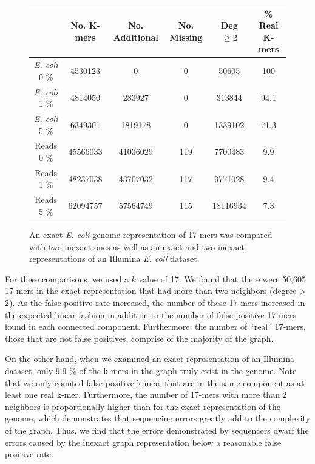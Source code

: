 \documentclass[12pt]{article} \usepackage{simplemargins}
\begin{document}
\begin{figure}
\begin{tabular}{ | c || c | c | c | c | c | }
\hline
 & No. K-mers & No. Additional & No. Missing & Deg $\ge 2$ & \% Real K-mers \\ \hline \hline
\emph{E. coli} 0 \% & 4530123 & 0 & 0 & 50605 & 100 \\ \hline
\emph{E. coli} 1 \% & 4814050 & 283927 & 0 & 313844 & 94.1 \\ \hline
\emph{E. coli} 5 \% & 6349301 & 1819178 & 0 & 1339102 & 71.3 \\ \hline
Reads 0 \% & 45566033 & 41036029 & 119 & 7700483 & 9.9 \\ \hline
Reads 1 \% & 48237038 & 43707032 & 117 & 9771028 & 9.4 \\ \hline
Reads 5 \% & 62094757 & 57564749 & 115 & 18116934 & 7.3 \\
\hline
\end{tabular}
\caption{An exact \emph{E. coli} genome representation of 17-mers was compared with 
two inexact ones as well as an exact and two inexact representations of an Illumina 
\emph{E. coli} dataset.}
\end{figure}

For these comparisons, we used a $k$ value of 17. We found 
that there were 50,605 17-mers in the exact representation that had more 
than two neighbors (degree > 2). As the false positive rate 
increased, the number of these 
17-mers increased in the expected linear fashion in addition to the number of 
false positive 17-mers found in each connected component. Furthermore, the number of 
``real'' 17-mers, those that are not false positives, 
comprise of the majority of the graph.

On the other hand, when we examined an exact representation of an Illumina dataset, 
only 9.9 \% of the k-mers in the graph truly exist in the genome. Note 
that we only counted false positive k-mers that are in the same component as 
at least one real k-mer. Furthermore, the number of 17-mers with more than 
2 neighbors is proportionally higher than for the exact representation of the 
genome, which demonstrates that sequencing errors greatly add to the complexity 
of the graph. Thus, we find that the errors demonstrated by 
sequencers dwarf the errors caused by the inexact graph representation 
below a reasonable false positive rate.
\end{document}
